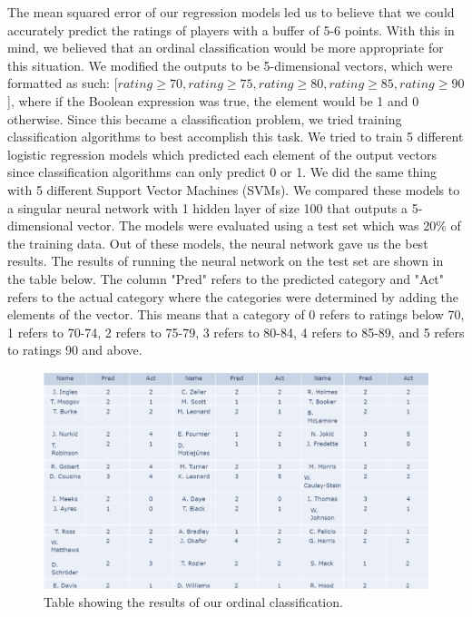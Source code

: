 \documentclass{article}
\begin{document}
The mean squared error of our regression models led us to believe that we could accurately predict the ratings of players with a buffer of 5-6 points. With this in mind, we believed that an ordinal classification would be more appropriate for this situation. We modified the outputs to be 5-dimensional vectors, which were formatted as such: \([rating\geq70, rating\geq75, rating\geq80, rating\geq85, rating\geq90\)], where if the Boolean expression was true, the element would be 1 and 0 otherwise. Since this became a classification problem, we tried training classification algorithms to best accomplish this task. We tried to train 5 different logistic regression models which predicted each element of the output vectors since classification algorithms can only predict 0 or 1. We did the same thing with 5 different Support Vector Machines (SVMs). We compared these models to a singular neural network with 1 hidden layer of size 100 that outputs a 5-dimensional vector. The models were evaluated using a test set which was 20\% of the training data. Out of these models, the neural network gave us the best results. The results of running the neural network on the test set are shown in the table below. The column "Pred" refers to the predicted category and "Act" refers to the actual category where the categories were determined by adding the elements of the vector. This means that a category of 0 refers to ratings below 70, 1 refers to 70-74, 2 refers to 75-79, 3 refers to 80-84, 4 refers to 85-89, and 5 refers to ratings 90 and above.
\begin{figure}[htp]
    \centering
    \includegraphics[width=12cm]{category_table.PNG}
    \caption{Table showing the results of our ordinal classification.}
\end{figure}
\end{document}
